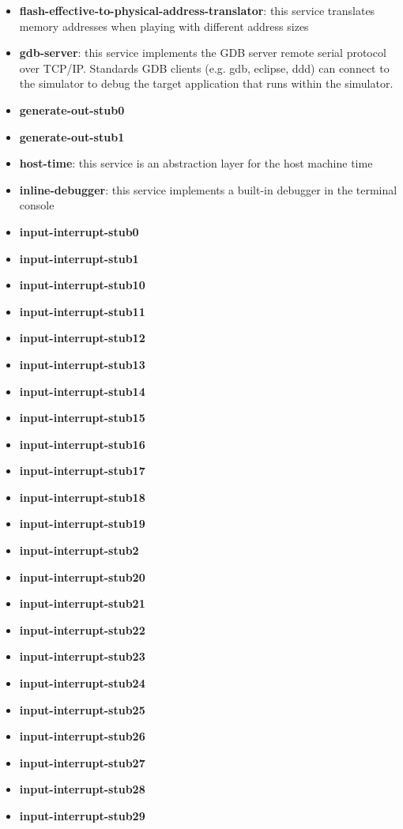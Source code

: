 \begin{itemize}
\item \textbf{flash-effective-to-physical-address-translator}: this service translates memory addresses when playing with different address sizes
\item \textbf{gdb-server}: this service implements the GDB server remote serial protocol over TCP/IP. Standards GDB clients (e.g. gdb, eclipse, ddd) can connect to the simulator to debug the target application that runs within the simulator.
\item \textbf{generate-out-stub0}
\item \textbf{generate-out-stub1}
\item \textbf{host-time}: this service is an abstraction layer for the host machine time
\item \textbf{inline-debugger}: this service implements a built-in debugger in the terminal console
\item \textbf{input-interrupt-stub0}
\item \textbf{input-interrupt-stub1}
\item \textbf{input-interrupt-stub10}
\item \textbf{input-interrupt-stub11}
\item \textbf{input-interrupt-stub12}
\item \textbf{input-interrupt-stub13}
\item \textbf{input-interrupt-stub14}
\item \textbf{input-interrupt-stub15}
\item \textbf{input-interrupt-stub16}
\item \textbf{input-interrupt-stub17}
\item \textbf{input-interrupt-stub18}
\item \textbf{input-interrupt-stub19}
\item \textbf{input-interrupt-stub2}
\item \textbf{input-interrupt-stub20}
\item \textbf{input-interrupt-stub21}
\item \textbf{input-interrupt-stub22}
\item \textbf{input-interrupt-stub23}
\item \textbf{input-interrupt-stub24}
\item \textbf{input-interrupt-stub25}
\item \textbf{input-interrupt-stub26}
\item \textbf{input-interrupt-stub27}
\item \textbf{input-interrupt-stub28}
\item \textbf{input-interrupt-stub29}

\end{itemize}
